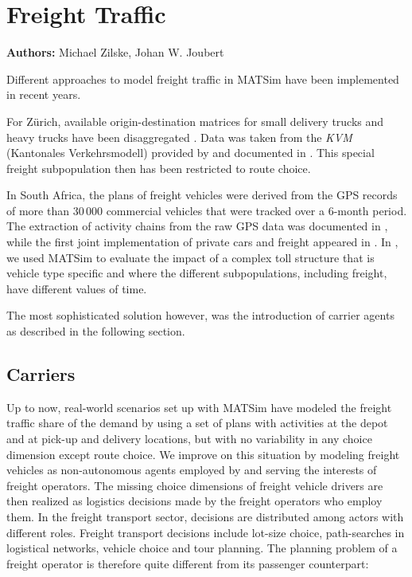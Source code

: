 \chapter{Freight Traffic}
\label{ch:freight}

\hfill \textbf{Authors:} Michael Zilske, Johan W. Joubert


Different approaches to model freight traffic in MATSim have been implemented in recent years. 

For Zürich, available origin-destination matrices for small delivery trucks and heavy trucks have been disaggregated \citet[][]{ShahM_TechRep_IVT_2010}. Data was taken from the \emph{KVM} (Kantonales Verkehrsmodell) provided by \citet{AMV_Webpage_2011} and documented in \citet[][]{GottardiBuergler_SV_1999}. This special freight subpopulation then has been restricted to route choice.

In South Africa, the plans of freight vehicles were derived from the GPS records of more than 30\,000 commercial vehicles that were tracked over a 6-month period. The extraction of activity chains from the raw GPS data was documented in \citet[][]{JoubertAxhausen_JTG_2011}, while the first joint implementation of private cars and freight appeared in \citet[][]{JoubertJEtAl_TRR_2010}. In \citet[][]{NagelKickhoeferJoubert2014HeterogeneousVoTsPROCEDIA}, we used MATSim to evaluate the impact of a complex toll structure that is vehicle type specific and where the different subpopulations, including freight, have different values of time.

The most sophisticated solution however, was the introduction of carrier agents as described in the following section. 

\section{Carriers}
\label{sec:carriers}
Up to now, real-world scenarios set up with MATSim have modeled the freight traffic share of
the demand by using a set of plans with activities at the depot and at pick-up and delivery
locations, but with no variability in any choice dimension except route choice. We improve on
this situation by modeling freight vehicles as non-autonomous agents employed by and serving
the interests of freight operators. The missing choice dimensions of freight vehicle drivers are
then realized as logistics decisions made by the freight operators who employ them. In the
freight transport sector, decisions are distributed among actors with different roles. Freight
transport decisions include lot-size choice, path-searches in logistical networks, vehicle choice
and tour planning. The planning problem of a freight operator is therefore quite different from
its passenger counterpart:

